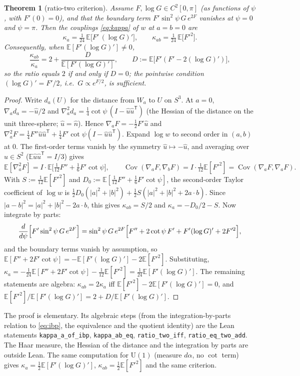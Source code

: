 \documentclass[11pt,a4paper]{article}
\newtheorem{theorem}{Theorem}
\theoremstyle{definition}
\theoremstyle{remark}
\newcommand{\E}{\mathbb{E}}
\newcommand{\Cov}{\operatorname{Cov}}
\newcommand{\code}[1]{\texttt{#1}}
\begin{document}
\begin{theorem}[ratio-two criterion]\label{thm:criterion}
Assume $F,\log G\in C^2[0,\pi]$ (as functions of $\psi$, with $F'(0)=0$), and that the boundary term $F'\sin^2\psi\,G\,e^{2F}$ vanishes at $\psi=0$ and $\psi=\pi$.
Then the couplings \eqref{eq:kappa} of $w$ at $a=b=0$ are
\begin{equation}\label{eq:ibp}
\kappa_a=\tfrac1{24}\,\E\bigl[F'\,(\log G)'\bigr],\qquad \kappa_{ab}=\tfrac1{24}\,\E\bigl[F'^2\bigr].
\end{equation}
Consequently, when $\E[F'(\log G)']\ne0$,
\[
\frac{\kappa_{ab}}{\kappa_a}=2+\frac{D}{\E[F'(\log G)']},\qquad D:=\E\bigl[F'(F'-2(\log G)')\bigr],
\]
so the ratio equals $2$ if and only if $D=0$; the pointwise condition $(\log G)'=F'/2$, i.e.\ $G\propto e^{F/2}$, is sufficient.
\end{theorem}

\begin{proof}
Write $d_a(U)$ for the distance from $W_a$ to $U$ on $S^3$.
At $a=0$, $\nabla_a d_a=-\hat u/2$ and $\nabla_a^2d_a=\tfrac14\cot\psi\,(I-\hat u\hat u^{\mathsf T})$ (the Hessian of the distance on the unit three-sphere; $\hat u=\hat n$).
Hence $\nabla_aF=-\tfrac12F'\hat u$ and $\nabla_a^2F=\tfrac14F''\hat u\hat u^{\mathsf T}+\tfrac14F'\cot\psi(I-\hat u\hat u^{\mathsf T})$.
Expand $\log w$ to second order in $(a,b)$ at $0$.
The first-order terms vanish by the symmetry $\hat u\mapsto-\hat u$, and averaging over $\hat u\in S^2$ ($\E\hat u\hat u^{\mathsf T}=I/3$) gives
\[
\E[\nabla_a^2F]=I\cdot\E\bigl[\tfrac1{12}F''+\tfrac16F'\cot\psi\bigr],\qquad \Cov(\nabla_aF,\nabla_bF)=I\cdot\tfrac1{12}\E[F'^2]=\Cov(\nabla_aF,\nabla_aF).
\]
With $S:=\tfrac1{12}\E[F'^2]$ and $D_0:=\E[\tfrac1{12}F''+\tfrac16F'\cot\psi]$, the second-order Taylor coefficient of $\log w$ is $\tfrac12D_0(|a|^2+|b|^2)+\tfrac12S(|a|^2+|b|^2+2a\cdot b)$.
Since $|a-b|^2=|a|^2+|b|^2-2a\cdot b$, this gives $\kappa_{ab}=S/2$ and $\kappa_a=-D_0/2-S$.
Now integrate by parts:
\[
\frac{d}{d\psi}\Bigl[F'\sin^2\psi\,G\,e^{2F}\Bigr]=\sin^2\psi\,G\,e^{2F}\Bigl[F''+2\cot\psi\,F'+F'(\log G)'+2F'^2\Bigr],
\]
and the boundary terms vanish by assumption, so $\E[F''+2F'\cot\psi]=-\E[F'(\log G)']-2\E[F'^2]$.
Substituting, $\kappa_a=-\tfrac1{24}\E[F''+2F'\cot\psi]-\tfrac1{12}\E[F'^2]=\tfrac1{24}\E[F'(\log G)']$.
The remaining statements are algebra: $\kappa_{ab}=2\kappa_a$ iff $\E[F'^2]-2\E[F'(\log G)']=0$, and $\E[F'^2]/\E[F'(\log G)']=2+D/\E[F'(\log G)']$.
\end{proof}

The proof is elementary.
Its algebraic steps (from the integration-by-parts relation to \eqref{eq:ibp}, the equivalence and the quotient identity) are the Lean statements \code{kappa\_a\_of\_ibp}, \code{kappa\_ab\_eq}, \code{ratio\_two\_iff}, \code{ratio\_eq\_two\_add}.
The Haar measure, the Hessian of the distance and the integration by parts are outside Lean.
The same computation for $\mathrm{U}(1)$ (measure $d\alpha$, no $\cot$ term) gives $\kappa_a=\tfrac12\E[F'(\log G)']$, $\kappa_{ab}=\tfrac12\E[F'^2]$ and the same criterion.
\end{document}
